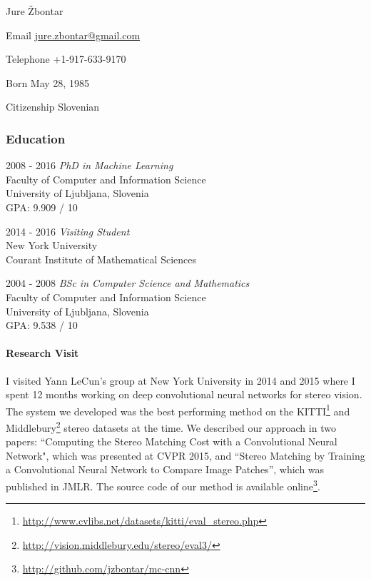 \documentclass[12pt,a4paper]{article}
\begin{document}
\begin{cv}{Jure \v{Z}bontar}

\begin{cvlist}{}
\item[Email] \href{mailto:jure.zbontar@gmail.com}{jure.zbontar@gmail.com}
\item[Telephone] +1-917-633-9170
\item[Born] May 28, 1985
\item[Citizenship] Slovenian

\end{cvlist}

\subsubsection*{Education}
\begin{cvlist}{}
\item[2008 - 2016] \emph{PhD in Machine Learning} \\
Faculty of Computer and Information Science \\
University of Ljubljana, Slovenia \\
GPA: 9.909 / 10

\item[2014 - 2016] \emph{Visiting Student} \\
New York University \\
Courant Institute of Mathematical Sciences

\item[2004 - 2008] \emph{BSc in Computer Science and Mathematics} \\
Faculty of Computer and Information Science \\
University of Ljubljana, Slovenia \\
GPA: 9.538 / 10

\end{cvlist}

\paragraph{Research Visit}
I visited Yann LeCun's group at New York University in 2014 and 2015 where I
spent 12 months working on deep convolutional neural networks for stereo
vision. The system we developed was the best performing method on the
KITTI\footnote{\url{http://www.cvlibs.net/datasets/kitti/eval_stereo.php}} and
Middlebury\footnote{\url{http://vision.middlebury.edu/stereo/eval3/}} stereo
datasets at the time. We described our approach in two papers: ``Computing the
Stereo Matching Cost with a Convolutional Neural Network", which was presented
at CVPR 2015, and ``Stereo Matching by Training a Convolutional Neural Network
to Compare Image Patches'', which was published in JMLR. The source code of our
method is available online\footnote{\url{http://github.com/jzbontar/mc-cnn}}.


\end{cv}
\end{document}
